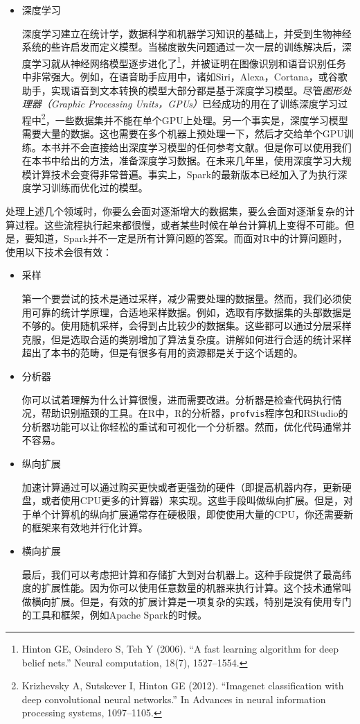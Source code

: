 \documentclass[
]{article}
\begin{document}
\begin{itemize}
\item
  深度学习

  深度学习建立在统计学，数据科学和机器学习知识的基础上，并受到生物神经系统的些许启发而定义模型。当梯度散失问题通过一次一层的训练解决后，深度学习就从神经网络模型逐步进化了\footnote{Hinton
    GE, Osindero S, Teh Y (2006). ``A fast learning algorithm for deep
    belief nets.'' Neural computation, 18(7), 1527--1554.}，并被证明在图像识别和语音识别任务中非常强大。例如，在语音助手应用中，诸如Siri，Alexa，Cortana，或谷歌助手，实现语音到文本转换的模型大部分都是基于深度学习模型。尽管\emph{图形处理器（Graphic
  Processing Units，GPUs）}已经成功的用在了训练深度学习过程中\footnote{Krizhevsky
    A, Sutskever I, Hinton GE (2012). ``Imagenet classification with
    deep convolutional neural networks.'' In Advances in neural
    information processing systems, 1097--1105.}，一些数据集并不能在单个GPU上处理。另一个事实是，深度学习模型需要大量的数据。这也需要在多个机器上预处理一下，然后才交给单个GPU训练。本书并不会直接给出深度学习模型的任何参考文献。但是你可以使用我们在本书中给出的方法，准备深度学习数据。在未来几年里，使用深度学习大规模计算技术会变得非常普遍。事实上，Spark的最新版本已经加入了为执行深度学习训练而优化过的模型。
\end{itemize}

处理上述几个领域时，你要么会面对逐渐增大的数据集，要么会面对逐渐复杂的计算过程。这些流程执行起来都很慢，或者某些时候在单台计算机上变得不可能。但是，要知道，Spark并不一定是所有计算问题的答案。而面对R中的计算问题时，使用以下技术会很有效：

\begin{itemize}
\item
  采样

  第一个要尝试的技术是通过采样，减少需要处理的数据量。然而，我们必须使用可靠的统计学原理，合适地采样数据。例如，选取有序数据集的头部数据是不够的。使用随机采样，会得到占比较少的数据集。这些都可以通过分层采样克服，但是选取合适的类别增加了算法复杂度。讲解如何进行合适的统计采样超出了本书的范畴，但是有很多有用的资源都是关于这个话题的。
\item
  分析器

  你可以试着理解为什么计算很慢，进而需要改进。分析器是检查代码执行情况，帮助识别瓶颈的工具。在R中，R的分析器，\texttt{profvis}程序包和RStudio的分析器功能可以让你轻松的重试和可视化一个分析器。然而，优化代码通常并不容易。
\item
  纵向扩展

  加速计算通过可以通过购买更快或者更强劲的硬件（即提高机器内存，更新硬盘，或者使用CPU更多的计算器）来实现。这些手段叫做纵向扩展。但是，对于单个计算机的纵向扩展通常存在硬极限，即使使用大量的CPU，你还需要新的框架来有效地并行化计算。
\item
  横向扩展

  最后，我们可以考虑把计算和存储扩大到对台机器上。这种手段提供了最高纬度的扩展性能。因为你可以使用任意数量的机器来执行计算。这个技术通常叫做横向扩展。但是，有效的扩展计算是一项复杂的实践，特别是没有使用专门的工具和框架，例如Apache
  Spark的时候。
\end{itemize}
\end{document}
